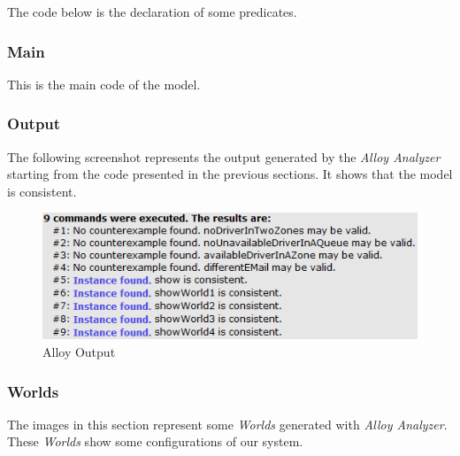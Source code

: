 \documentclass[a4paper]{article}
\begin{document}
The code below is the declaration of some predicates.

\nopagebreak
\begin{minipage}[c]{\codeWidth}

\end{minipage}

\subsubsection{Main}

This is the main code of the model.

\nopagebreak
\begin{minipage}[c]{\codeWidth}

\end{minipage}

\subsubsection{Output}

The following screenshot represents the output generated by the \emph{Alloy Analyzer} starting from the code presented in the previous sections. It shows that the model is consistent.

\nopagebreak
\begin{figure}[H]
\includegraphics[width=.7\textwidth]{Alloy-Output}
\centering
\caption{Alloy Output}
\label{fig:alloyoutput}
\end{figure}

\subsubsection{Worlds}

The images in this section represent some \emph{Worlds} generated with \emph{Alloy Analyzer}. These \emph{Worlds} show some configurations of our system.

\newlength{\worldsWidth}
\setlength{\worldsWidth}{.9\textwidth}
\end{document}
